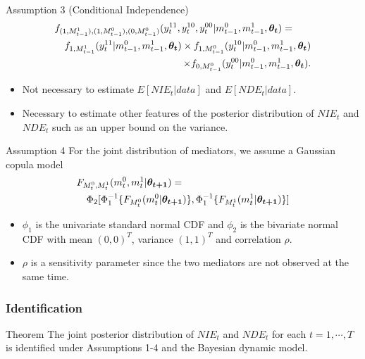 \documentclass{beamer}
\begin{document}
\begin{frame}
\begin{block}{Assumption 3 (Conditional Independence)}
\begin{eqnarray*}
\lefteqn{f_{(1,M_{t-1}^1),(1,M_{t-1}^0),(0,M_{t-1}^0)}(y_t^{11},y_t^{10},y_t^{00}|m_{t-1}^0, m_{t-1}^1,\boldsymbol{\theta_t})=}\\
& & f_{1,M_{t-1}^1}(y_t^{11}|m_{t-1}^0, m_{t-1}^1,\boldsymbol{\theta_t}) \times
f_{1,M_{t-1}^0}(y_t^{10}|m_{t-1}^0, m_{t-1}^1,\boldsymbol{\theta_t})\\
& & \times
f_{0,M_{t-1}^0}(y_t^{00}|m_{t-1}^0, m_{t-1}^1,\boldsymbol{\theta_t}).
\end{eqnarray*}
\end{block}
\begin{itemize}
\item Not necessary to estimate $E[NIE_t|data]$ and $E[NDE_t|data]$.
\item Necessary to estimate other features of the posterior distribution of $NIE_t$ and $NDE_t$ such as an upper bound on the variance.
\end{itemize}
\end{frame}

\begin{frame}
\begin{block}{Assumption 4}
For the joint distribution of mediators, we assume a Gaussian copula model
\begin{eqnarray*}
\lefteqn{F_{M_t^0,M_t^1}(m_t^0,m_t^1 | \boldsymbol{\theta_{t+1}}) =}\\ & &\Phi_2[\Phi_1^{-1}\{F_{M_t^0}(m_t^0|\boldsymbol{\theta_{t+1}})\}, \Phi_1^{-1}\{F_{M_t^1}(m_t^1|\boldsymbol{\theta_{t+1}})\}]
\end{eqnarray*}
\end{block}
\begin{itemize}
\item $\phi_1$ is the univariate standard normal CDF and $\phi_2$ is the bivariate normal CDF with mean $(0,0)^T$, variance $(1,1)^T$ and correlation $\rho$.
\item $\rho$ is a sensitivity parameter since the two mediators are not observed at the same time.
\end{itemize}
\end{frame}


\begin{frame}
\frametitle{Identification}
\begin{block}{Theorem}
The joint posterior distribution of $NIE_t$ and $NDE_t$ for each $t = 1, \cdots, T$ is identified under Assumptions 1-4 and the Bayesian dynamic model.
\end{block}
\end{frame}
\end{document}
